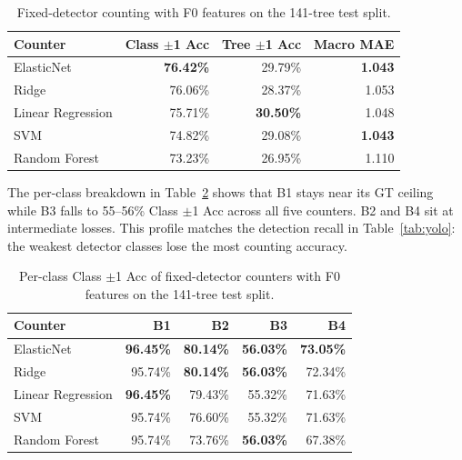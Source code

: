﻿\documentclass[conference]{IEEEtran}
\begin{document}
\begin{table}[!htbp]
  \centering
  \footnotesize
  \setlength{\tabcolsep}{3pt}
  \caption{Fixed-detector counting with F0 features on the 141-tree test split.}
  \label{tab:fixed}
  \begin{tabular}{@{}lrrr@{}}
    \toprule
    Counter           & Class $\pm$1 Acc & Tree $\pm$1 Acc  & Macro MAE      \\
    \midrule
    ElasticNet        & \textbf{76.42\%} & 29.79\%          & \textbf{1.043} \\
    Ridge             & 76.06\%          & 28.37\%          & 1.053          \\
    Linear Regression & 75.71\%          & \textbf{30.50\%} & 1.048          \\
    SVM               & 74.82\%          & 29.08\%          & \textbf{1.043} \\
    Random Forest     & 73.23\%          & 26.95\%          & 1.110          \\
    \bottomrule
  \end{tabular}
\end{table}

The per-class breakdown in Table~\ref{tab:perclass} shows that B1 stays near
its GT ceiling while B3 falls to 55--56\% Class $\pm$1 Acc across all five
counters. B2 and B4 sit at intermediate losses. This profile matches the
detection recall in Table~\ref{tab:yolo}: the weakest detector classes lose the
most counting accuracy.

\begin{table}[!htbp]
  \centering
  \scriptsize
  \setlength{\tabcolsep}{3pt}
  \caption{Per-class Class $\pm$1 Acc of fixed-detector counters with F0
    features on the 141-tree test split.}
  \label{tab:perclass}
  \begin{tabular}{@{}lrrrr@{}}
    \toprule
    Counter           & B1               & B2               & B3               & B4               \\
    \midrule
    ElasticNet        & \textbf{96.45\%} & \textbf{80.14\%} & \textbf{56.03\%} & \textbf{73.05\%} \\
    Ridge             & 95.74\%          & \textbf{80.14\%} & \textbf{56.03\%} & 72.34\%          \\
    Linear Regression & \textbf{96.45\%} & 79.43\%          & 55.32\%          & 71.63\%          \\
    SVM               & 95.74\%          & 76.60\%          & 55.32\%          & 71.63\%          \\
    Random Forest     & 95.74\%          & 73.76\%          & \textbf{56.03\%} & 67.38\%          \\
    \bottomrule
  \end{tabular}
\end{table}
\end{document}
